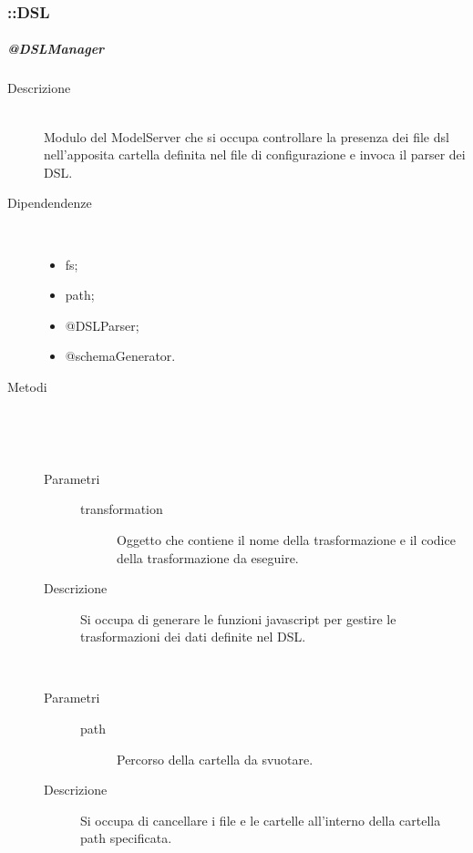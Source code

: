 \subsubsection{::DSL}
\subparagraph{@DSLManager}
\begin{description}
 \item[Descrizione] \hfill \\
  Modulo del ModelServer che si occupa controllare la presenza dei file dsl nell'apposita cartella definita nel file di configurazione e invoca il parser dei DSL.
 \item[Dipendendenze] \hfill \\
 \begin{itemize}
 \item{fs};
  \item{path};
  \item{@DSLParser};
  \item{@schemaGenerator}.
 \end{itemize} 
 \item[Metodi] \hfill \\
 \begin{mldescription}
  \hfill \\
  	\begin{description}
   		\item[Parametri] \hfill
   			\begin{description}
   				\item[transformation]
   				Oggetto che contiene il nome della trasformazione e il codice della trasformazione da eseguire.
   			\end{description}
   		\item[Descrizione]
   		Si occupa di generare le funzioni javascript per gestire le trasformazioni dei dati definite nel DSL.
   	\end{description}
  \hfill \\
   	\begin{description}
    		\item[Parametri] \hfill
    			\begin{description}
    				\item[path]
    				Percorso della cartella da svuotare.
    			\end{description}
    		\item[Descrizione]
    		Si occupa di cancellare i file e le cartelle all'interno della cartella path specificata.
    	\end{description}

\end{mldescription}
\end{description}
